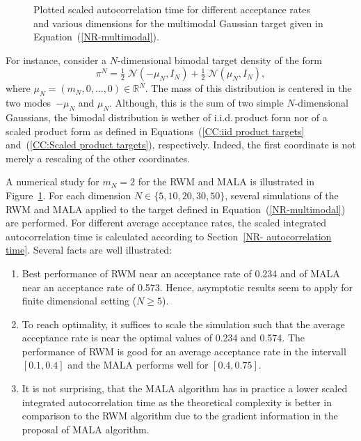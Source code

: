\begin{figure}
\begin{center}
  \vspace*{1mm}
  \label{fig:OptimalScaling-MALA-dimensions}
 \end{center}
  \caption{Plotted scaled autocorrelation time for different acceptance rates and various dimensions for the multimodal Gaussian target given in Equation~(\ref{NR-multimodal}).}
  \label{fig:OptimalScaling for RWM and MALA in various dimensions}
\end{figure}

For instance, consider a $N$-dimensional bimodal target density of the form
\begin{equation}
 \label{NR-multimodal}
 \pi^{N} = \tfrac{1}{2} \; \mathcal{N}(-\mu_N, I_N ) +  \tfrac{1}{2} \; \mathcal{N}(\mu_N, I_N ),
\end{equation}
where $\mu_N = (m_N, 0, \dots, 0) \in \mathbb{R}^N$. The mass of this distribution is centered in the two modes~$-\mu_N$ and $\mu_N$. Although, this is the sum of two simple $N$-dimensional Gaussians, the bimodal distribution is wether of i.i.d.\,product form nor of a scaled product form as defined in Equations~(\ref{CC:iid product targets} and~(\ref{CC:Scaled product targets}), respectively. Indeed, the first coordinate is not merely a rescaling of the other coordinates. 


A numerical study for $m_N = 2$ for the RWM and MALA is illustrated in Figure~\ref{fig:OptimalScaling for RWM and MALA in various dimensions}. For each dimension $N \in \{ 5, 10, 20, 30, 50 \}$, several simulations of the RWM and MALA applied to the target defined in Equation~(\ref{NR-multimodal}) are performed. For different average acceptance rates, the scaled integrated autocorrelation time is calculated according to Section~\ref{NR- autocorrelation time}. Several facts are well illustrated:
\begin{enumerate}
 \item Best performance of RWM near an acceptance rate of 0.234 and of MALA near an acceptance rate of 0.573. Hence, asymptotic results seem to apply for finite dimensional setting ($N \geq 5$).
 \item To reach optimality, it suffices to scale the simulation such that the average acceptance rate is near the optimal values of 0.234 and 0.574. The performance of RWM is good for an average acceptance rate in the intervall $[0.1, 0.4]$ and the MALA performs well for $[0.4, 0.75]$.
 \item It is not surprising, that the MALA algorithm has in practice a lower scaled integrated autocorrelation time as the theoretical complexity is better in comparison to the RWM algorithm due to the gradient information in the proposal of MALA algorithm.
\end{enumerate}

